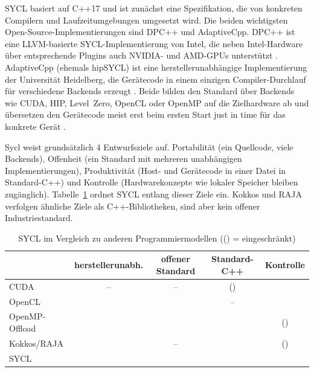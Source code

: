 \documentclass[12pt,a4paper]{article}
\begin{document}
SYCL basiert auf C++17 \cite{khronos2020sycl} und ist zunächst eine
Spezifikation, die von konkreten Compilern und Laufzeitumgebungen umgesetzt
wird. Die beiden wichtigsten Open-Source-Implementierungen sind DPC++ und
AdaptiveCpp. DPC++ ist eine LLVM-basierte
SYCL-Implementierung von Intel, die neben
Intel-Hardware über entsprechende Plugins auch NVIDIA- und AMD-GPUs unterstützt
\cite{intel_llvm, reinders2023dpcpp}. AdaptiveCpp (ehemals hipSYCL) ist eine
herstellerunabhängige Implementierung der Universität Heidelberg, die
Gerätecode in einem einzigen Compiler-Durchlauf für verschiedene Backends
erzeugt \cite{alpay2020hipsycl, adaptivecpp, alpay2023sscp}. Beide bilden
den Standard über Backends wie CUDA, HIP, Level~Zero, OpenCL oder OpenMP auf
die Zielhardware ab und übersetzen den Gerätecode meist erst beim ersten
Start just in time für das konkrete Gerät \cite{alpay2023sscp}.

Sycl weist grundsätzlich 4 Entwurfsziele auf. Portabilität (ein
Quellcode, viele Backends), Offenheit (ein Standard mit mehreren
unabhängigen Implementierungen), Produktivität (Host- und Gerätecode
in einer Datei in Standard-C++) und Kontrolle (Hardwarekonzepte wie
lokaler Speicher bleiben zugänglich). Tabelle~\ref{tab:vergleich} ordnet
SYCL entlang dieser Ziele ein. Kokkos \cite{edwards2014kokkos} und RAJA
\cite{beckingsale2019raja} verfolgen ähnliche Ziele als C++-Bibliotheken, sind
aber kein offener Industriestandard.

\begin{table}[htbp]
\centering
\small
\newcommand{\ja}{\ding{51}}
\newcommand{\nein}{--}
\newcommand{\teils}{(\ding{51})}
\caption[SYCL im Vergleich zu anderen Programmiermodellen]{SYCL im Vergleich zu anderen Programmiermodellen (() = eingeschränkt)}
\label{tab:vergleich}
\begin{tabular}{@{}lcccc@{}}
\toprule
 & herstellerunabh. & offener Standard & Standard-C++ & Kontrolle \\
\midrule
CUDA            & \nein   & \nein   & \teils & \ja \\
OpenCL          & \ja     & \ja     & \nein  & \ja \\
OpenMP-Offload  & \ja     & \ja     & \ja    & \teils \\
Kokkos/RAJA     & \ja     & \nein   & \ja    & \teils \\
SYCL            & \ja     & \ja     & \ja    & \ja \\
\bottomrule
\end{tabular}
\end{table}
\end{document}
